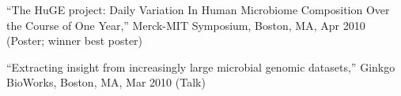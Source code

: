 \documentclass[overlapped,line,11pt]{res}
\newenvironment{list2}{
  \begin{list}{$\bullet$}{%
      \setlength{\itemsep}{0in}
      \setlength{\parsep}{0in} \setlength{\parskip}{0in}
      \setlength{\topsep}{0in} \setlength{\partopsep}{0in} 
      \setlength{\leftmargin}{0.2in}}}{\end{list}}
\begin{document}
\begin{resume}
\begin{revnumerate}[43]
\item {``The HuGE project: Daily Variation In Human Microbiome
Composition Over the Course of One Year,'' Merck-MIT Symposium,
Boston, MA, Apr 2010 (Poster; winner best poster)}
\vspace*{0mm}


\item {``Extracting insight from increasingly large microbial genomic
  datasets,'' Ginkgo BioWorks, Boston, MA, Mar 2010 (Talk)}
\vspace*{0mm}

\end{revnumerate}




\end{resume}
\end{document}
